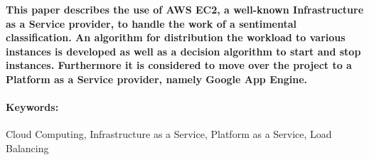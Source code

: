 
\textbf{
This paper describes the use of AWS EC2, a well-known Infrastructure as a Service provider, to handle the work of a sentimental classification. An algorithm for distribution the workload to various instances is developed as well as a decision algorithm to start and stop instances. Furthermore it is considered to move over the project to a Platform as a Service provider, namely Google App Engine.
}

\paragraph{Keywords:} Cloud Computing, Infrastructure as a Service, Platform as a Service, Load Balancing